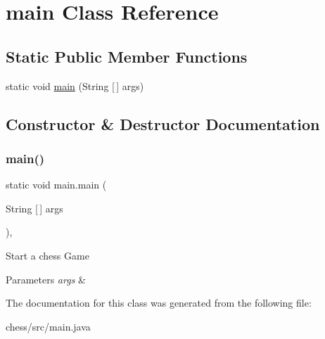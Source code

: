 \hypertarget{classmain}{}\section{main Class Reference}
\label{classmain}
\subsection*{Static Public Member Functions}
\begin{DoxyCompactItemize}
\item 
static void \mbox{\hyperlink{classmain_a99007049b7989878d6bb692039101a7d}{main}} (String \mbox{[}$\,$\mbox{]} args)
\end{DoxyCompactItemize}


\subsection{Constructor \& Destructor Documentation}
\mbox{\label{classmain_a99007049b7989878d6bb692039101a7d}} 
\subsubsection{\texorpdfstring{main()}{main()}}
{\footnotesize\ttfamily static void main.\+main (\begin{DoxyParamCaption}\item[{String \mbox{[}$\,$\mbox{]}}]{args }\end{DoxyParamCaption})\hspace{0.3cm}{\ttfamily [inline]}, {\ttfamily [static]}}

Start a chess Game 
\begin{DoxyParams}{Parameters}
{\em args} & \\
\hline
\end{DoxyParams}


The documentation for this class was generated from the following file\+:\begin{DoxyCompactItemize}
\item 
chess/src/main.\+java\end{DoxyCompactItemize}
